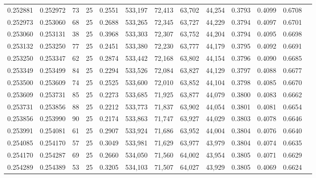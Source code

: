 \begin{tabular}{rrrrrrrrrrrrr}
0.252881 & 0.252972 &    73 &  25 &                                     0.2551 & 533,197 &  72,413 &  63,702 &  44,254 & 0.3793 & 0.4099 & 0.6708 \\
0.252973 & 0.253060 &    68 &  25 &                                     0.2688 & 533,265 &  72,345 &  63,727 &  44,229 & 0.3794 & 0.4097 & 0.6701 \\
0.253060 & 0.253131 &    38 &  25 &                                     0.3968 & 533,303 &  72,307 &  63,752 &  44,204 & 0.3794 & 0.4095 & 0.6698 \\
0.253132 & 0.253250 &    77 &  25 &                                     0.2451 & 533,380 &  72,230 &  63,777 &  44,179 & 0.3795 & 0.4092 & 0.6691 \\
0.253250 & 0.253347 &    62 &  25 &                                     0.2874 & 533,442 &  72,168 &  63,802 &  44,154 & 0.3796 & 0.4090 & 0.6685 \\
0.253349 & 0.253499 &    84 &  25 &                                     0.2294 & 533,526 &  72,084 &  63,827 &  44,129 & 0.3797 & 0.4088 & 0.6677 \\
0.253500 & 0.253609 &    74 &  25 &                                     0.2525 & 533,600 &  72,010 &  63,852 &  44,104 & 0.3798 & 0.4085 & 0.6670 \\
0.253609 & 0.253731 &    85 &  25 &                                     0.2273 & 533,685 &  71,925 &  63,877 &  44,079 & 0.3800 & 0.4083 & 0.6662 \\
0.253731 & 0.253856 &    88 &  25 &                                     0.2212 & 533,773 &  71,837 &  63,902 &  44,054 & 0.3801 & 0.4081 & 0.6654 \\
0.253856 & 0.253990 &    90 &  25 &                                     0.2174 & 533,863 &  71,747 &  63,927 &  44,029 & 0.3803 & 0.4078 & 0.6646 \\
0.253991 & 0.254081 &    61 &  25 &                                     0.2907 & 533,924 &  71,686 &  63,952 &  44,004 & 0.3804 & 0.4076 & 0.6640 \\
0.254085 & 0.254170 &    57 &  25 &                                     0.3049 & 533,981 &  71,629 &  63,977 &  43,979 & 0.3804 & 0.4074 & 0.6635 \\
0.254170 & 0.254287 &    69 &  25 &                                     0.2660 & 534,050 &  71,560 &  64,002 &  43,954 & 0.3805 & 0.4071 & 0.6629 \\
0.254289 & 0.254389 &    53 &  25 &                                     0.3205 & 534,103 &  71,507 &  64,027 &  43,929 & 0.3805 & 0.4069 & 0.6624 \\

\end{tabular}
